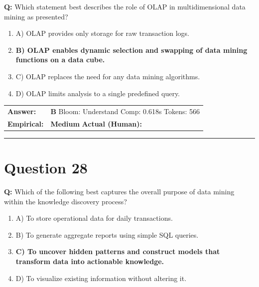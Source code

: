 \documentclass[9pt]{article}
\begin{document}
\textbf{Q:} Which statement best describes the role of OLAP in multidimensional data mining as presented?

\begin{enumerate}[label=\textbf{\alph{*})}, nosep]
    \item A) OLAP provides only storage for raw transaction logs.
    \item \textbf{B) OLAP enables dynamic selection and swapping of data mining functions on a data cube.} %
    \item C) OLAP replaces the need for any data mining algorithms.
    \item D) OLAP limits analysis to a single predefined query.

\end{enumerate}

\begin{tabular}{@{}l p{10.5cm}@{}}
\textbf{Answer:} & \textbf{B} \hspace{1em} Bloom: Understand \hspace{1em} Comp: 0.618s \hspace{1em} Tokens: 566 \\
\textbf{Empirical:} & \textbf{Medium} \hspace{1em} \textbf{Actual (Human):} \underline{\hspace{5cm}}
\end{tabular}

\vspace{0.2cm}
\rule{\textwidth}{0.4pt}
\vspace{0.2cm}


\section*{Question 28}

\textbf{Q:} Which of the following best captures the overall purpose of data mining within the knowledge discovery process?

\begin{enumerate}[label=\textbf{\alph{*})}, nosep]
    \item A) To store operational data for daily transactions.
    \item B) To generate aggregate reports using simple SQL queries.
    \item \textbf{C) To uncover hidden patterns and construct models that transform data into actionable knowledge.} %
    \item D) To visualize existing information without altering it.

\end{enumerate}
\end{document}
